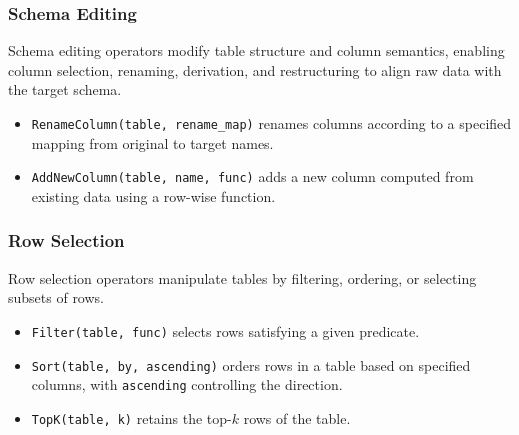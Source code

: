 \subsubsection{Schema Editing}
Schema editing operators modify table structure and column semantics, enabling column selection, renaming, derivation, and restructuring to align raw data with the target schema.
%
\begin{itemize}[leftmargin=*]
    \item \texttt{RenameColumn(table, rename\_map)} renames columns according to a specified mapping from original to target names.
    \item \texttt{AddNewColumn(table, name, func)} adds a new column computed from existing data using a row-wise function.
\end{itemize}

\subsubsection{Row Selection}
Row selection operators manipulate tables by filtering, ordering, or selecting subsets of rows.
%
\begin{itemize}[leftmargin=*]
    \item \texttt{Filter(table, func)} selects rows satisfying a given predicate.
    \item \texttt{Sort(table, by, ascending)} orders rows in a table based on specified columns, with \texttt{ascending} controlling the direction.
    \item \texttt{TopK(table, k)} retains the top-$k$ rows of the table.
\end{itemize}

